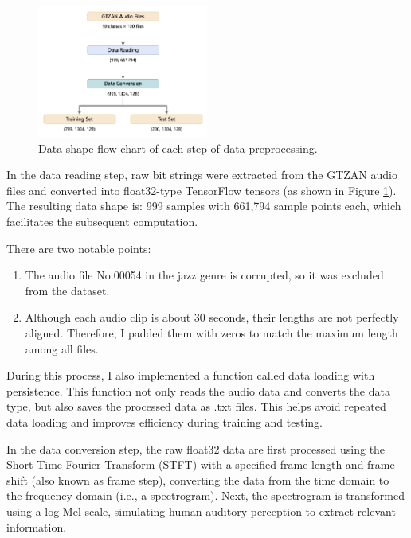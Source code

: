 \documentclass{article}
\begin{document}
      \begin{figure}[H]
        \centering
        \includegraphics[width=0.5\textwidth]{figs/shape_preprocess.png}
        \caption{Data shape flow chart of each step of data preprocessing.}
        \label{fig:shape_preprocess}
      \end{figure}

      In the data reading step, raw bit strings were extracted from the GTZAN audio files and converted into float32-type TensorFlow tensors (as shown in Figure \ref{fig:shape_preprocess}). The resulting data shape is: 999 samples with 661,794 sample points each, which facilitates the subsequent computation.

      There are two notable points:

      \begin{enumerate}
        \item The audio file No.00054 in the jazz genre is corrupted, so it was excluded from the dataset.
        \item Although each audio clip is about 30 seconds, their lengths are not perfectly aligned. Therefore, I padded them with zeros to match the maximum length among all files.
      \end{enumerate}
      
      During this process, I also implemented a function called data loading with persistence. This function not only reads the audio data and converts the data type, but also saves the processed data as .txt files. This helps avoid repeated data loading and improves efficiency during training and testing.

      In the data conversion step, the raw float32 data are first processed using the Short-Time Fourier Transform (STFT) with a specified frame length and frame shift (also known as frame step), converting the data from the time domain to the frequency domain (i.e., a spectrogram). Next, the spectrogram is transformed using a log-Mel scale, simulating human auditory perception to extract relevant information.
\end{document}
